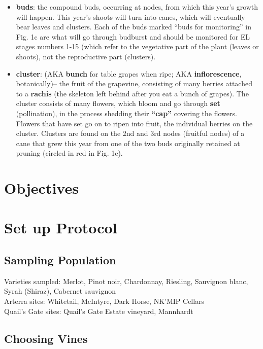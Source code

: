 \documentclass[11pt,letter]{article}
\newenvironment{smitemize}{
\begin{itemize}
  \setlength{\itemsep}{0pt}
  \setlength{\parskip}{0.8pt}
  \setlength{\parsep}{0pt}}
{\end{itemize}
}
\begin{document}
\begin{smitemize}
\item {\bf buds}: the compound buds, occurring at nodes, from which this year’s growth will happen. This year’s shoots will turn into canes, which will eventually bear leaves and clusters. Each of the buds marked “buds for monitoring” in Fig. 1c are what will go through budburst and should be monitored for EL stages numbers 1-15 (which refer to the vegetative part of the plant (leaves or shoots), not the reproductive part (clusters). 
\item {\bf cluster}: (AKA {\bf bunch} for table grapes when ripe; AKA {\bf inflorescence}, botanically)-- the fruit of the grapevine, consisting of many berries attached to a {\bf rachis} (the skeleton left behind after you eat a bunch of grapes). The cluster consists of many flowers, which bloom and go through {\bf set} (pollination), in the process shedding their {\bf “cap”} covering the flowers. Flowers that have set go on to ripen into fruit, the individual berries on the cluster. Clusters are found on the 2nd and 3rd nodes (fruitful nodes) of a cane that grew this year from one of the two buds originally retained at pruning (circled in red in Fig. 1c).
\end{smitemize}

\section{Objectives}

\section{Set up Protocol}

\subsection{Sampling Population}
Varieties sampled: Merlot, Pinot noir, Chardonnay, Riesling, Sauvignon blanc, Syrah (Shiraz), Cabernet sauvignon \\
Arterra sites: Whitetail, McIntyre, Dark Horse, NK'MIP Cellars \\
Quail's Gate sites: Quail's Gate Estate vineyard, Mannhardt \\

\subsection{Choosing Vines}
\end{document}
